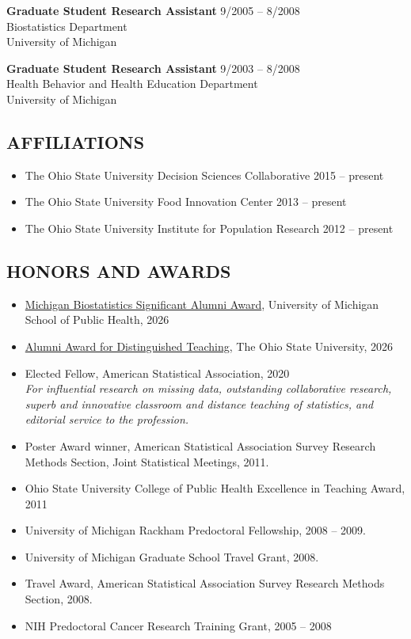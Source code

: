 \documentclass[
  english,
  letterpaper,
  DIV=11,
  numbers=noendperiod]{scrartcl}
\providecommand{\tightlist}{%
  \setlength{\itemsep}{0pt}\setlength{\parskip}{0pt}}
\begin{document}
\textbf{Graduate Student Research Assistant} {9/2005 -- 8/2008}\\
Biostatistics Department\\
University of Michigan

\textbf{Graduate Student Research Assistant} {9/2003 -- 8/2008}\\
Health Behavior and Health Education Department\\
University of Michigan

\subsection{AFFILIATIONS}\label{affiliations}

\begin{itemize}
\tightlist
\item
  The Ohio State University Decision Sciences Collaborative {2015 --
  present}
\item
  The Ohio State University Food Innovation Center {2013 -- present}
\item
  The Ohio State University Institute for Population Research {2012 --
  present}
\end{itemize}

\subsection{HONORS AND AWARDS}\label{honors-and-awards}

\begin{itemize}
\tightlist
\item
  \href{https://sph.umich.edu/biostat/significant-alumni-award.html}{Michigan
  Biostatistics Significant Alumni Award}, University of Michigan School
  of Public Health, 2026
\item
  \href{https://faculty.osu.edu/faculty-success/faculty-awards/alumni-award-distinguished-teaching}{Alumni
  Award for Distinguished Teaching}, The Ohio State University, 2026
\item
  Elected Fellow, American Statistical Association, 2020\\
  \emph{For influential research on missing data, outstanding
  collaborative research, superb and innovative classroom and distance
  teaching of statistics, and editorial service to the profession.}
\item
  Poster Award winner, American Statistical Association Survey Research
  Methods Section, Joint Statistical Meetings, 2011.
\item
  Ohio State University College of Public Health Excellence in Teaching
  Award, 2011
\item
  University of Michigan Rackham Predoctoral Fellowship, 2008 -- 2009.
\item
  University of Michigan Graduate School Travel Grant, 2008.
\item
  Travel Award, American Statistical Association Survey Research Methods
  Section, 2008.
\item
  NIH Predoctoral Cancer Research Training Grant, 2005 -- 2008
\end{itemize}
\end{document}
